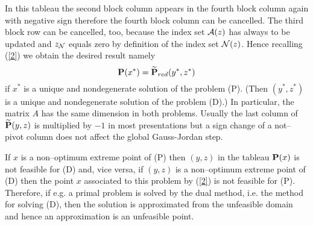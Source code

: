 In this tableau the second block column appears in the fourth block column
again with negative sign therefore the fourth block column can be cancelled.
The third block row can be cancelled, too, because the index set ${\cal A}(z)$ has
always to be updated and $z_{{\cal N}}$ equals zero by definition of the index set
${\cal N}(z)$.  Hence recalling (\ref{2}) we obtain the desired result namely
\[
{\bf P}(x^*) = \widetilde{\bf{P}}_{red}(y^*,z^*)
\]
if $x^*$ is a unique and nondegenerate solution of the problem (P). (Then
$(y^*,z^*)$ is a unique and nondegenerate solution of the problem (D).)
In particular, the matrix $A$ has the same dimension in
both problems. Usually the last column of $\widetilde{{\bf P}}(y,z)$ is multiplied by
$-1$ in most presentations but a sign change of a not--pivot column does not
affect the global {\sc Gauss-Jordan} step.
\par
If $x$ is a non--optimum extreme point of (P) then $(y,z)$ in the
tableau ${\bf P}(x)$ is not feasible for (D) and, vice versa, if $(y,z)$ is a
non--optimum extreme point of (D) then the point $x$ associated to
this problem by (\ref{2}) is not feasible for (P). Therefore, if e.g. a primal
problem is solved by the dual method, i.e. the method for solving
(D), then the solution is approximated from the unfeasible domain and hence an
approximation is an unfeasible point.
